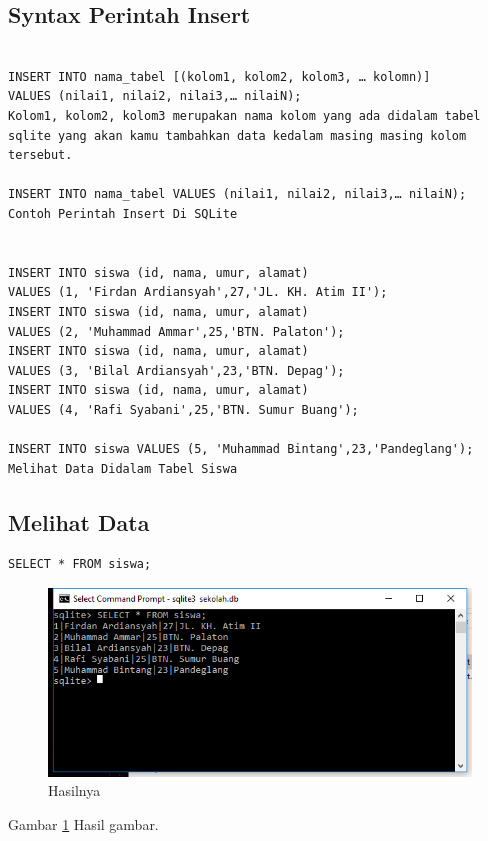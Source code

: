		\subsection{Syntax Perintah Insert}
\begin{verbatim}

INSERT INTO nama_tabel [(kolom1, kolom2, kolom3, … kolomn)]
VALUES (nilai1, nilai2, nilai3,… nilaiN);
Kolom1, kolom2, kolom3 merupakan nama kolom yang ada didalam tabel sqlite yang akan kamu tambahkan data kedalam masing masing kolom tersebut.

INSERT INTO nama_tabel VALUES (nilai1, nilai2, nilai3,… nilaiN);
Contoh Perintah Insert Di SQLite


INSERT INTO siswa (id, nama, umur, alamat)
VALUES (1, 'Firdan Ardiansyah',27,'JL. KH. Atim II');
INSERT INTO siswa (id, nama, umur, alamat)
VALUES (2, 'Muhammad Ammar',25,'BTN. Palaton');
INSERT INTO siswa (id, nama, umur, alamat)
VALUES (3, 'Bilal Ardiansyah',23,'BTN. Depag');
INSERT INTO siswa (id, nama, umur, alamat)
VALUES (4, 'Rafi Syabani',25,'BTN. Sumur Buang');

INSERT INTO siswa VALUES (5, 'Muhammad Bintang',23,'Pandeglang'); 
Melihat Data Didalam Tabel Siswa
\end{verbatim}


	\subsection{Melihat Data}
		\begin{verbatim}
SELECT * FROM siswa;
		\end{verbatim}
		
	\begin{figure}[ht]
		\centerline{\includegraphics[width=1\textwidth]{figures/Sql.png}}
		\caption{Hasilnya}
		\label{Sql}
	\end{figure}
	Gambar \ref{Sql} Hasil gambar.
	
